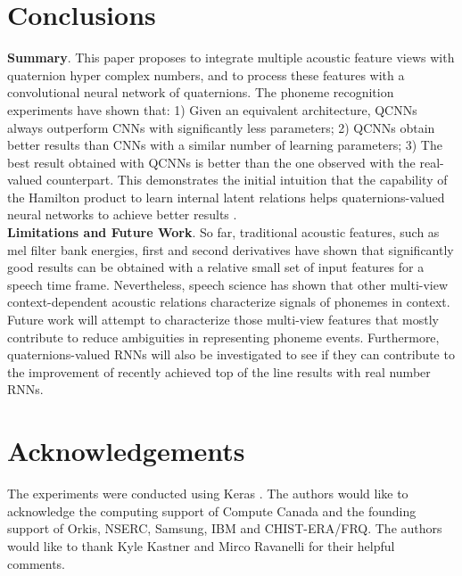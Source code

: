 \documentclass[a4paper]{article}
\begin{document}


\section{Conclusions}
\textbf{Summary}.
This paper proposes to integrate multiple acoustic feature views with quaternion hyper complex numbers, and to process these features with a convolutional neural network of quaternions. The phoneme recognition experiments have shown that: 1) Given an equivalent architecture, QCNNs always outperform CNNs with significantly less parameters; 2) QCNNs obtain better results than CNNs with a similar number of learning parameters; 3) The best result obtained with QCNNs is better than the one observed with the real-valued counterpart. This demonstrates the initial intuition that the capability of the Hamilton product to learn internal latent relations helps quaternions-valued neural networks to achieve better results .\\   
\textbf{Limitations and Future Work}.
So far, traditional acoustic features, such as mel filter bank energies, first and second derivatives have shown that significantly good results can be obtained with a relative small set of input features for a speech time frame. Nevertheless, speech science has shown that other multi-view context-dependent acoustic relations characterize signals of phonemes in context.
Future work will attempt to characterize those multi-view features that mostly contribute to reduce ambiguities in representing phoneme events. Furthermore, quaternions-valued RNNs will also be investigated to see if they can contribute to the improvement of recently achieved top of the line results with real number RNNs.




\section{Acknowledgements}
The experiments were conducted using Keras \cite{chollet2015keras}. The authors would like to acknowledge the computing support of Compute Canada and the founding support of Orkis, NSERC, Samsung, IBM and CHIST-ERA/FRQ. The authors would like to thank Kyle Kastner and Mirco Ravanelli for their helpful comments.   

\newpage




\end{document}
